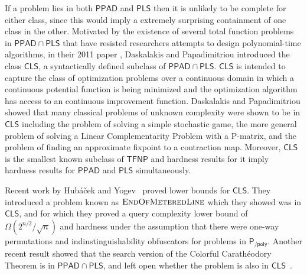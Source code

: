 \documentclass[a4paper,UKenglish]{lipics2}
\theoremstyle{definition}
\def\cc#1{\mathsf{#1}}
\def\CLS{\ensuremath{\cc{CLS}}\xspace}
\def\PPAD{\ensuremath{\cc{PPAD}}\xspace}
\def\PLS{\ensuremath{\cc{PLS}}\xspace}
\def\PPADPLS{\ensuremath{\cc{PPAD} \cap \cc{PLS}}\xspace}
\def\problem#1{\textsc{#1}}
\def\EOML{\problem{EndOfMeteredLine}\xspace}
\begin{document}
If a problem lies in both \PPAD and \PLS then it is unlikely to be complete for 
either class, since this would imply a extremely surprising containment of one class in the other.
Motivated by the existence of several total function problems in \PPADPLS
that have resisted researchers attempts to design polynomial-time algorithms,
in their 2011 paper \cite{daskalakis2011continuous}, Daskalakis and Papadimitriou introduced
the class $\CLS$, a syntactically defined subclass of $\cc{PPAD} \cap \cc{PLS}$.
\CLS is intended to capture the class of optimization problems over a continuous
domain in which a continuous potential function is being minimized and the
optimization algorithm has access to an continuous improvement function.
Daskalakis and Papadimitriou showed that many classical problems of unknown
complexity were shown to be in $\CLS$ including the problem of solving a simple
stochastic game, the more general problem of solving a Linear Complementarity
Problem with a P-matrix, and the problem of finding an approximate fixpoint
to a contraction map. Moreover, $\CLS$ is the smallest known subclass of
$\cc{TFNP}$ and hardness results for it imply hardness results for
$\cc{PPAD}$ and $\cc{PLS}$ simultaneously. 


Recent work by Hub\'{a}\v{c}ek and Yogev~\cite{hubavcek2017hardness} proved 
lower bounds for \CLS. They introduced
a problem known as $\EOML$ which they showed was in $\CLS$, and for which they
proved a query complexity lower bound of $\Omega(2^{n/2}/\sqrt{n})$ and
hardness under the assumption that there were one-way permutations and
indinstinguishability obfuscators for problems in $\cc{P_{/poly}}$.
%
Another recent result showed that the search version of the Colorful
Carath\'eodory Theorem is in $\cc{PPAD} \cap \cc{PLS}$, and left open
whether the problem is also in $\CLS$~\cite{colorfulcara2017}.
\end{document}
